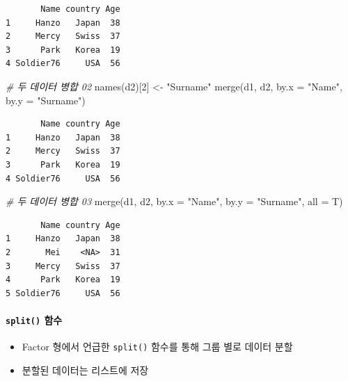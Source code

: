 \documentclass[
  11pt,
]{krantz}
\newenvironment{Shaded}{\begin{snugshade}}{\end{snugshade}}
\newcommand{\AttributeTok}[1]{\textcolor[rgb]{0.61,0.61,0.61}{#1}}
\newcommand{\CommentTok}[1]{\textcolor[rgb]{0.37,0.37,0.37}{\textit{#1}}}
\newcommand{\DecValTok}[1]{\textcolor[rgb]{0.06,0.06,0.06}{#1}}
\newcommand{\FunctionTok}[1]{\textcolor[rgb]{0,0,0}{#1}}
\newcommand{\NormalTok}[1]{#1}
\newcommand{\OtherTok}[1]{\textcolor[rgb]{0.37,0.37,0.37}{#1}}
\newcommand{\StringTok}[1]{\textcolor[rgb]{0.5,0.5,0.5}{#1}}
\providecommand{\tightlist}{%
  \setlength{\itemsep}{0pt}\setlength{\parskip}{0pt}}
\begin{document}
\begin{verbatim}
       Name country Age
1     Hanzo   Japan  38
2     Mercy   Swiss  37
3      Park   Korea  19
4 Soldier76     USA  56
\end{verbatim}

\begin{Shaded}
\begin{Highlighting}[]
\CommentTok{\# 두 데이터 병합 02}
\FunctionTok{names}\NormalTok{(d2)[}\DecValTok{2}\NormalTok{] }\OtherTok{\textless{}{-}} \StringTok{"Surname"}
\FunctionTok{merge}\NormalTok{(d1, d2, }\AttributeTok{by.x =} \StringTok{"Name"}\NormalTok{, }\AttributeTok{by.y =} \StringTok{"Surname"}\NormalTok{)}
\end{Highlighting}
\end{Shaded}

\begin{verbatim}
       Name country Age
1     Hanzo   Japan  38
2     Mercy   Swiss  37
3      Park   Korea  19
4 Soldier76     USA  56
\end{verbatim}

\begin{Shaded}
\begin{Highlighting}[]
\CommentTok{\# 두 데이터 병합 03}
\FunctionTok{merge}\NormalTok{(d1, d2, }
      \AttributeTok{by.x =} \StringTok{"Name"}\NormalTok{, }\AttributeTok{by.y =} \StringTok{"Surname"}\NormalTok{, }
      \AttributeTok{all =}\NormalTok{ T)}
\end{Highlighting}
\end{Shaded}

\begin{verbatim}
       Name country Age
1     Hanzo   Japan  38
2       Mei    <NA>  31
3     Mercy   Swiss  37
4      Park   Korea  19
5 Soldier76     USA  56
\end{verbatim}

\normalsize

\hypertarget{split-df}{%
\paragraph*{\texorpdfstring{\texttt{split()} 함수}{split() 함수}}\label{split-df}}

\begin{itemize}
\tightlist
\item
  Factor 형에서 언급한 \texttt{split()} 함수를 통해 그룹 별로 데이터 분할
\item
  분할된 데이터는 리스트에 저장
\end{itemize}
\end{document}
